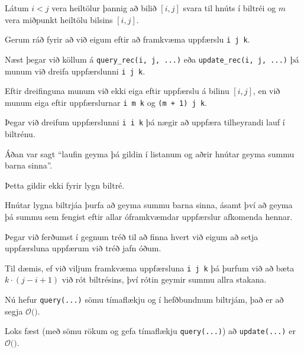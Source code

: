 {
	{
		\item<1-> Látum $i < j$ vera heiltölur þannig að bilið $[i, j]$ svara til hnúts í biltréi og $m$ vera miðpunkt heiltölu bilsins $[i, j]$.
		\item<2-> Gerum ráð fyrir að við eigum eftir að framkvæma uppfærslu \texttt{i j k}.
		\item<3-> Næst þegar við köllum á \texttt{query\_rec(i, j, ...)} eða \texttt{update\_rec(i, j, ...)}
					þá munum við dreifa uppfærslunni \texttt{i j k}.
		\item<4-> Eftir dreifinguna munum við ekki eiga eftir uppfærslu á bilinu $[i, j]$, en við munum eiga eftir uppfærslurnar
					\texttt{i m k} og \texttt{(m + 1) j k}.
		\item<5-> Þegar við dreifum uppfærslunni \texttt{i i k} þá nægir að uppfæra tilheyrandi lauf í biltrénu.
	}
}

{
	{
		\item<1-> Áðan var sagt ``laufin geyma þá gildin í listanum og aðrir hnútar geyma summu barna sinna''.
		\item<2-> Þetta gildir ekki fyrir lygn biltré.
		\item<3-> Hnútar lygna biltrjáa þurfa að geyma summu barna sinna,
					ásamt því að geyma þá summu sem fengist eftir allar óframkvæmdar uppfærslur afkomenda hennar.
		\item<4-> Þegar við ferðumst í gegnum tréð til að finna hvert við eigum að setja uppfærsluna uppfærum við tréð jafn óðum.
		\item<5-> Til dæmis, ef við viljum framkvæma uppfærsluna \texttt{i j k} þá þurfum við að bæta $k \cdot (j - i + 1)$ við rót biltrésins,
					því rótin geymir summu allra stakana.
	}
}

{
}

{
	{
		\item<1-> Nú hefur \texttt{query(...)} sömu tímaflækju og í hefðbundnum biltrjám, það er að segja $\mathcal{O}($\onslide<2->{$\log n$}$)$.
		\item<3-> Loks fæst (með sömu rökum og gefa tímaflækju \texttt{query(...)}) að \texttt{update(...)} er
					$\mathcal{O}($\onslide<4->{$\log n$}$)$.
	}
}

{
}


